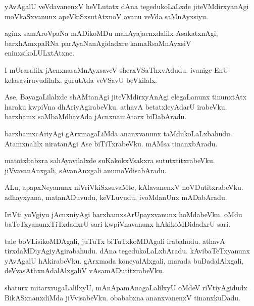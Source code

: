 \documentclass{article}
\begin{document}
\begin{mn}
yAvAgalU veVdavanenxV heVLutatx dAna tegedukoLaLxde jiteVMdirxyanAgi moVkaSxvanunx apeVkiSxsutAtxnoV 
avanu veVda saMnAyxsiyu.
\end{mn}

\begin{mn}
aginx samAroVpaNa mADikoMDu mahAyajacnxdalilx AsakatxnAgi, barxhAmxpaRNa parAyaNanAgidadxre 
kamaRsaMnAyxsiV eninxsikoLULxtAtxne.
\end{mn}

\begin{mn}
I mUraralilx jAcnxnasaMnAyxsaveV sherxVSaThxvAdudu. ivanige 
EnU kelasaviruvudilalx. gurutAda veVSavU beVkilalx.
\end{mn}

\begin{mn}
Ase, BayagaLilalxde shAMtanAgi jiteVMdirxyAnAgi elegaLanunx tinunxtAtx haraku kwpiVna 
dhAriyAgirabeVku. athavA betatxleyAdarU irabeVku. barxhamx saMbaMdhavAda jAcnxnamAtarx 
biDabAradu.
\end{mn}


\begin{mn}
barxhamxcAriyAgi gArxmagaLiMda ananxvanunx  taMdukoLaLxbahudu. Atamxnalilx niratanAgi Ase 
biTiTxrabeVku. mAMsa tinanxbAradu.
\end{mn}

\begin{mn}
matotxbabxra sahAyavilalxde suKakokxVsakxra sututxtitxrabeVku. jiVvavanAnxgali, sAvanAnxgali 
anumoVdisabAradu.
\end{mn}

\begin{mn}
ALu, apapxNeyanunx niVriVkiSxsuvaMte, kAlavanenxV noVDutitxrabeVku. adhayxyana, matanADuvudu, 
keVLuvudu, ivoMdanUnx mADabAradu.
\end{mn}

\begin{mn}
IriVti yoVgiyu jAcnxniyAgi barxhamxsArUpayxvanunx hoMdabeVku. oMdu baTeTxyanunxTiTxdadxrU sari 
kwpiVnavanunx hAkikoMDidadxrU sari.
\end{mn}

\begin{mn}
tale boVLisikoMDAgali, juTuTx biTuTxkoMDAgali irabahudu. athavA tirxdaMDiyAgiyAgirabahudu. dAna 
tegedukoLaLxbAradu. kAvibaTeTxyanunx yAvAgalU hAkirabeVku. gArxmada koneyalAlxgali, marada 
buDadalAlxgali, deVvasAthxnAdalAlxgaliV vAsamADutitxrabeVku.
\end{mn}

\begin{mn}
shaturx mitarxrugaLalilxyU, mAnApamAnagaLalilxyU oMdeV riVtiyAgidudx BikASxnanxdiMda jiVvisabeVku.
obababxna ananxvanenxV tinanxkuDadu.
\end{mn}
\end{document}
